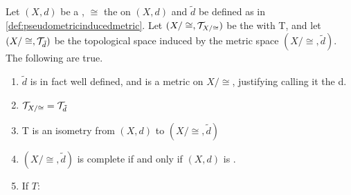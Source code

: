 \begin{prop}
    \label{prop:pseudometricinducedmetric}
    Let $(X,d)$ be a \PseudometricSpace, $\cong$ the \RelationOfZeroDistance on $(X,d)$ and $\tilde{d}$ be defined as in \ref{def:pseudometricinducedmetric}.
    Let $(X/\cong, \mathcal{T}_{X/\cong})$ be the  \QuotientTopologicalSpace with \QuotientMap T, and let $(X/\cong, \mathcal{T}_{\tilde{d}})$ be the topological space induced by the metric space $(X/\cong, \tilde{d})$. 
    The following are true. 
    \begin{enumerate}
        \item $\tilde{d}$ is in fact well defined, and is a metric on $X/\cong$, justifying calling it the \MetricInducedByPseudometric d.
        \item $\mathcal{T}_{X/\cong} = \mathcal{T}_{\tilde{d}}$
        \item T is an isometry from $(X,d)$ to $(X/\cong, \tilde{d})$
        \item $(X/\cong, \tilde{d})$ is complete if and only if $(X, d)$ is \PseudometricComplete.
        \item If $T:$
    \end{enumerate}


\end{prop}